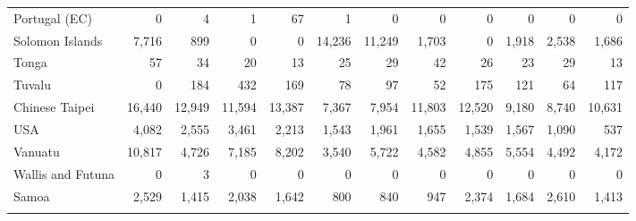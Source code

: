 \begin{longtable}{lrrrrrrrrrrr}
  Portugal (EC) & 0 & 4 & 1 & 67 & 1 & 0 & 0 & 0 & 0 & 0 & 0 \\ 
  Solomon Islands & 7,716 & 899 & 0 & 0 & 14,236 & 11,249 & 1,703 & 0 & 1,918 & 2,538 & 1,686 \\ 
  Tonga & 57 & 34 & 20 & 13 & 25 & 29 & 42 & 26 & 23 & 29 & 13 \\ 
  Tuvalu & 0 & 184 & 432 & 169 & 78 & 97 & 52 & 175 & 121 & 64 & 117 \\ 
  Chinese Taipei & 16,440 & 12,949 & 11,594 & 13,387 & 7,367 & 7,954 & 11,803 & 12,520 & 9,180 & 8,740 & 10,631 \\ 
  USA & 4,082 & 2,555 & 3,461 & 2,213 & 1,543 & 1,961 & 1,655 & 1,539 & 1,567 & 1,090 & 537 \\ 
  Vanuatu & 10,817 & 4,726 & 7,185 & 8,202 & 3,540 & 5,722 & 4,582 & 4,855 & 5,554 & 4,492 & 4,172 \\ 
  Wallis and Futuna & 0 & 3 & 0 & 0 & 0 & 0 & 0 & 0 & 0 & 0 & 0 \\ 
  Samoa & 2,529 & 1,415 & 2,038 & 1,642 & 800 & 840 & 947 & 2,374 & 1,684 & 2,610 & 1,413 \\ 
  \hline
\label{tabA1_1}
\end{longtable}
